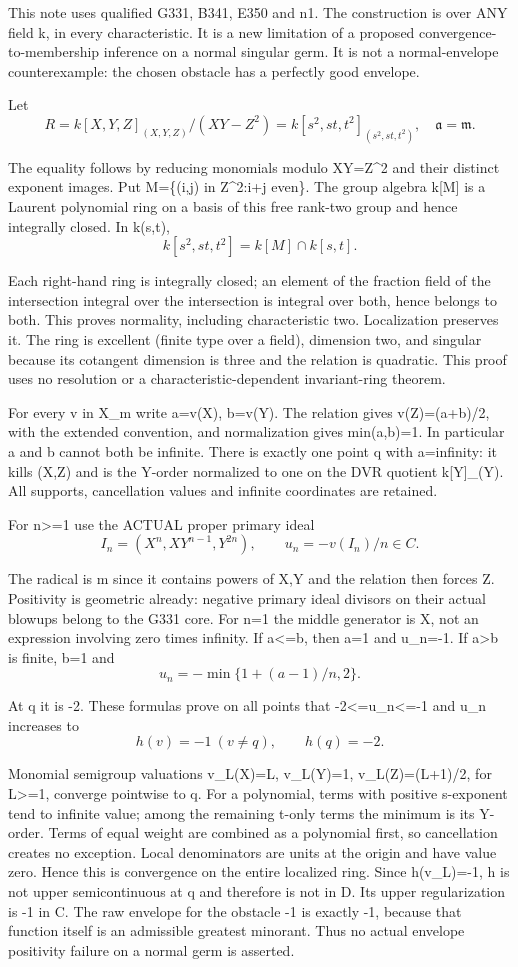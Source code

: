 \documentclass[11pt]{article}
\begin{document}
This note uses qualified G331, B341, E350 and n1. The construction is over ANY field k, in every characteristic. It is a new limitation of a proposed convergence-to-membership inference on a normal singular germ. It is not a normal-envelope counterexample: the chosen obstacle has a perfectly good envelope.

Let
\[
R=k[X,Y,Z]_{(X,Y,Z)}/(XY-Z^2)=k[s^2,st,t^2]_{(s^2,st,t^2)},\quad \mathfrak a=\mathfrak m.
\]

The equality follows by reducing monomials modulo XY=Z\textasciicircum{}2 and their distinct exponent images. Put M=\{(i,j) in Z\textasciicircum{}2:i+j even\}. The group algebra k[M] is a Laurent polynomial ring on a basis of this free rank-two group and hence integrally closed. In k(s,t),
\[
k[s^2,st,t^2]=k[M]\cap k[s,t].
\]

Each right-hand ring is integrally closed; an element of the fraction field of the intersection integral over the intersection is integral over both, hence belongs to both. This proves normality, including characteristic two. Localization preserves it. The ring is excellent (finite type over a field), dimension two, and singular because its cotangent dimension is three and the relation is quadratic. This proof uses no resolution or a characteristic-dependent invariant-ring theorem.

For every v in X\_m write a=v(X), b=v(Y). The relation gives v(Z)=(a+b)/2, with the extended convention, and normalization gives min(a,b)=1. In particular a and b cannot both be infinite. There is exactly one point q with a=infinity: it kills (X,Z) and is the Y-order normalized to one on the DVR quotient k[Y]\_(Y). All supports, cancellation values and infinite coordinates are retained.

For n>=1 use the ACTUAL proper primary ideal
\[
I_n=(X^n,XY^{n-1},Y^{2n}),\qquad u_n=-v(I_n)/n\in C.
\]

The radical is m since it contains powers of X,Y and the relation then forces Z. Positivity is geometric already: negative primary ideal divisors on their actual blowups belong to the G331 core. For n=1 the middle generator is X, not an expression involving zero times infinity. If a<=b, then a=1 and u\_n=-1. If a>b is finite, b=1 and
\[
u_n=-\min\{1+(a-1)/n,2\}.
\]

At q it is -2. These formulas prove on all points that -2<=u\_n<=-1 and u\_n increases to
\[
h(v)=-1\ (v\ne q),\qquad h(q)=-2.
\]

Monomial semigroup valuations v\_L(X)=L, v\_L(Y)=1, v\_L(Z)=(L+1)/2, for L>=1, converge pointwise to q. For a polynomial, terms with positive s-exponent tend to infinite value; among the remaining t-only terms the minimum is its Y-order. Terms of equal weight are combined as a polynomial first, so cancellation creates no exception. Local denominators are units at the origin and have value zero. Hence this is convergence on the entire localized ring. Since h(v\_L)=-1, h is not upper semicontinuous at q and therefore is not in D. Its upper regularization is -1 in C. The raw envelope for the obstacle -1 is exactly -1, because that function itself is an admissible greatest minorant. Thus no actual envelope positivity failure on a normal germ is asserted.
\end{document}
